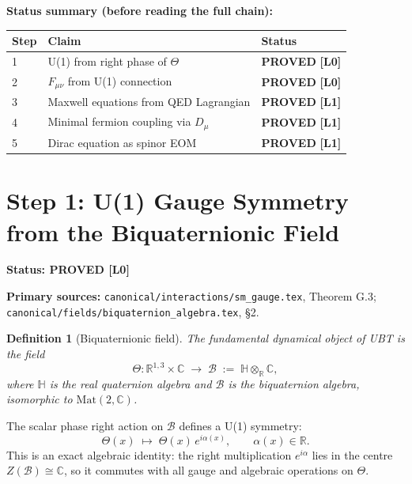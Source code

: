 \documentclass[11pt,a4paper]{article}
\newtheorem{definition}{Definition}
\newcommand{\Lzero}{\textbf{[L0]}}
\newcommand{\Lone}{\textbf{[L1]}}
\newcommand{\PROVED}{\textbf{PROVED}}
\begin{document}
\noindent\textbf{Status summary (before reading the full chain):}
\begin{center}
\begin{tabular}{lll}
\hline
\textbf{Step} & \textbf{Claim} & \textbf{Status} \\
\hline
1 & U(1) from right phase of $\Theta$ & \PROVED{} \Lzero \\
2 & $F_{\mu\nu}$ from U(1) connection & \PROVED{} \Lzero \\
3 & Maxwell equations from QED Lagrangian & \PROVED{} \Lone \\
4 & Minimal fermion coupling via $D_\mu$ & \PROVED{} \Lone \\
5 & Dirac equation as spinor EOM & \PROVED{} \Lone \\
\hline
\end{tabular}
\end{center}

\section{Step 1: U(1) Gauge Symmetry from the Biquaternionic Field}

\noindent\textbf{Status: \PROVED{} \Lzero}

\noindent\textbf{Primary sources:}
\texttt{canonical/interactions/sm\_gauge.tex}, Theorem G.3;
\texttt{canonical/fields/biquaternion\_algebra.tex}, \S2.

\medskip

\begin{definition}[Biquaternionic field]
The fundamental dynamical object of UBT is the field
\begin{equation}
  \Theta : \mathbb{R}^{1,3}\times\mathbb{C} \;\longrightarrow\;
  \mathcal{B} \;:=\; \mathbb{H}\otimes_{\mathbb{R}}\mathbb{C},
\end{equation}
where $\mathbb{H}$ is the real quaternion algebra and $\mathcal{B}$ is the
biquaternion algebra, isomorphic to $\mathrm{Mat}(2,\mathbb{C})$.
\end{definition}

The scalar phase right action on $\mathcal{B}$ defines a U(1) symmetry:
\begin{equation}\label{eq:U1action}
  \Theta(x) \;\mapsto\; \Theta(x)\,e^{i\alpha(x)}, \qquad \alpha(x)\in\mathbb{R}.
\end{equation}
This is an exact algebraic identity: the right multiplication $e^{i\alpha}$
lies in the centre $Z(\mathcal{B}) \cong \mathbb{C}$, so it commutes with all
gauge and algebraic operations on $\Theta$.
\end{document}
